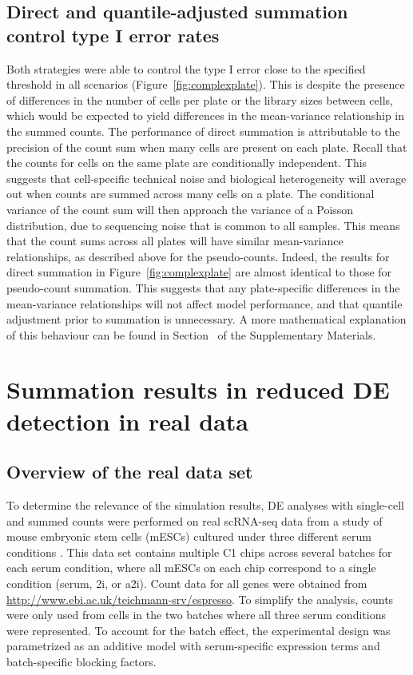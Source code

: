 \documentclass[oupdraft]{bio}
\begin{document}
\subsection{Direct and quantile-adjusted summation control type I error rates}
Both strategies were able to control the type I error close to the specified threshold in all scenarios (Figure~\ref{fig:complexplate}).
This is despite the presence of differences in the number of cells per plate or the library sizes between cells,
    which would be expected to yield differences in the mean-variance relationship in the summed counts.
The performance of direct summation is attributable to the precision of the count sum when many cells are present on each plate.
Recall that the counts for cells on the same plate are conditionally independent. 
This suggests that cell-specific technical noise and biological heterogeneity will average out when counts are summed across many cells on a plate.
The conditional variance of the count sum will then approach the variance of a Poisson distribution, due to sequencing noise \citep{marioni2008rnaseq} that is common to all samples.
This means that the count sums across all plates will have similar mean-variance relationships, as described above for the pseudo-counts.
Indeed, the results for direct summation in Figure~\ref{fig:complexplate} are almost identical to those for pseudo-count summation.
This suggests that any plate-specific differences in the mean-variance relationships will not affect model performance, and that quantile adjustment prior to summation is unnecessary.
A more mathematical explanation of this behaviour can be found in Section~\suppmeanvar{} of the Supplementary Materials.

\section{Summation results in reduced DE detection in real data}

\subsection{Overview of the real data set}
To determine the relevance of the simulation results, DE analyses with single-cell and summed counts were performed on real scRNA-seq data from a study of mouse embryonic stem cells (mESCs) cultured under three different serum conditions \citep{kolod2015single}.
This data set contains multiple C1 chips across several batches for each serum condition, where all mESCs on each chip correspond to a single condition (serum, 2i, or a2i). 
Count data for all genes were obtained from \url{http://www.ebi.ac.uk/teichmann-srv/espresso}.
To simplify the analysis, counts were only used from cells in the two batches where all three serum conditions were represented.
To account for the batch effect, the experimental design was parametrized as an additive model with serum-specific expression terms and batch-specific blocking factors.
\end{document}
